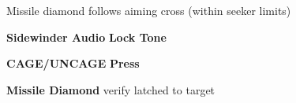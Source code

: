 \begin{checklistenumerate}
{    Missile diamond follows aiming cross (within seeker limits)

    \begin{subenumerate}[start=3]
        \item \textbf{Sidewinder Audio} \dotfill \textbf{Lock Tone}
        \item \textbf{CAGE/UNCAGE} \dotfill \textbf{Press}
        \item \textbf{Missile Diamond} \dotfill verify latched to target
    \end{subenumerate}}
\end{checklistenumerate}

\clearpage

